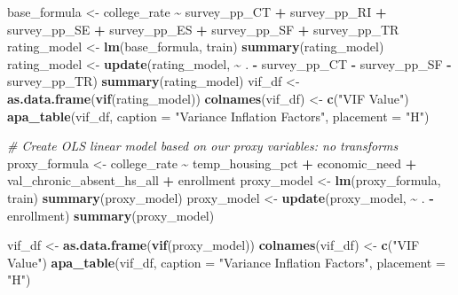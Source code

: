 \documentclass[
  man,floatsintext]{apa6}
\newenvironment{Shaded}{\begin{snugshade}}{\end{snugshade}}
\newcommand{\AttributeTok}[1]{\textcolor[rgb]{0.13,0.29,0.53}{#1}}
\newcommand{\CommentTok}[1]{\textcolor[rgb]{0.56,0.35,0.01}{\textit{#1}}}
\newcommand{\FunctionTok}[1]{\textcolor[rgb]{0.13,0.29,0.53}{\textbf{#1}}}
\newcommand{\NormalTok}[1]{#1}
\newcommand{\OtherTok}[1]{\textcolor[rgb]{0.56,0.35,0.01}{#1}}
\newcommand{\SpecialCharTok}[1]{\textcolor[rgb]{0.81,0.36,0.00}{\textbf{#1}}}
\newcommand{\StringTok}[1]{\textcolor[rgb]{0.31,0.60,0.02}{#1}}
\begin{document}
\begin{Shaded}
\begin{Highlighting}[]
\NormalTok{base\_formula }\OtherTok{\textless{}{-}}\NormalTok{ college\_rate }\SpecialCharTok{\textasciitilde{}}\NormalTok{ survey\_pp\_CT }\SpecialCharTok{+}\NormalTok{ survey\_pp\_RI }\SpecialCharTok{+}\NormalTok{ survey\_pp\_SE }\SpecialCharTok{+}\NormalTok{ survey\_pp\_ES }\SpecialCharTok{+}\NormalTok{ survey\_pp\_SF }\SpecialCharTok{+}\NormalTok{ survey\_pp\_TR}
\NormalTok{rating\_model }\OtherTok{\textless{}{-}} \FunctionTok{lm}\NormalTok{(base\_formula,}
\NormalTok{                   train)}
\FunctionTok{summary}\NormalTok{(rating\_model)}
\NormalTok{rating\_model }\OtherTok{\textless{}{-}} \FunctionTok{update}\NormalTok{(rating\_model, }\SpecialCharTok{\textasciitilde{}}\NormalTok{ . }\SpecialCharTok{{-}}\NormalTok{ survey\_pp\_CT }\SpecialCharTok{{-}}\NormalTok{ survey\_pp\_SF }\SpecialCharTok{{-}}\NormalTok{ survey\_pp\_TR)}
\FunctionTok{summary}\NormalTok{(rating\_model)}
\NormalTok{vif\_df }\OtherTok{\textless{}{-}} \FunctionTok{as.data.frame}\NormalTok{(}\FunctionTok{vif}\NormalTok{(rating\_model))}
\FunctionTok{colnames}\NormalTok{(vif\_df) }\OtherTok{\textless{}{-}} \FunctionTok{c}\NormalTok{(}\StringTok{"VIF Value"}\NormalTok{)}
\FunctionTok{apa\_table}\NormalTok{(vif\_df, }\AttributeTok{caption =} \StringTok{"Variance Inflation Factors"}\NormalTok{, }\AttributeTok{placement =} \StringTok{"H"}\NormalTok{)}


\CommentTok{\# Create OLS linear model based on our proxy variables: no transforms}
\NormalTok{proxy\_formula }\OtherTok{\textless{}{-}}\NormalTok{ college\_rate }\SpecialCharTok{\textasciitilde{}}\NormalTok{ temp\_housing\_pct }\SpecialCharTok{+}\NormalTok{ economic\_need }\SpecialCharTok{+}\NormalTok{ val\_chronic\_absent\_hs\_all }\SpecialCharTok{+}\NormalTok{ enrollment}
\NormalTok{proxy\_model }\OtherTok{\textless{}{-}} \FunctionTok{lm}\NormalTok{(proxy\_formula, train)}
\FunctionTok{summary}\NormalTok{(proxy\_model)}
\NormalTok{proxy\_model }\OtherTok{\textless{}{-}} \FunctionTok{update}\NormalTok{(proxy\_model, }\SpecialCharTok{\textasciitilde{}}\NormalTok{ . }\SpecialCharTok{{-}}\NormalTok{ enrollment)}
\FunctionTok{summary}\NormalTok{(proxy\_model)}

\NormalTok{vif\_df }\OtherTok{\textless{}{-}} \FunctionTok{as.data.frame}\NormalTok{(}\FunctionTok{vif}\NormalTok{(proxy\_model))}
\FunctionTok{colnames}\NormalTok{(vif\_df) }\OtherTok{\textless{}{-}} \FunctionTok{c}\NormalTok{(}\StringTok{"VIF Value"}\NormalTok{)}
\FunctionTok{apa\_table}\NormalTok{(vif\_df, }\AttributeTok{caption =} \StringTok{"Variance Inflation Factors"}\NormalTok{, }\AttributeTok{placement =} \StringTok{"H"}\NormalTok{)}


\end{Highlighting}
\end{Shaded}
\end{document}
